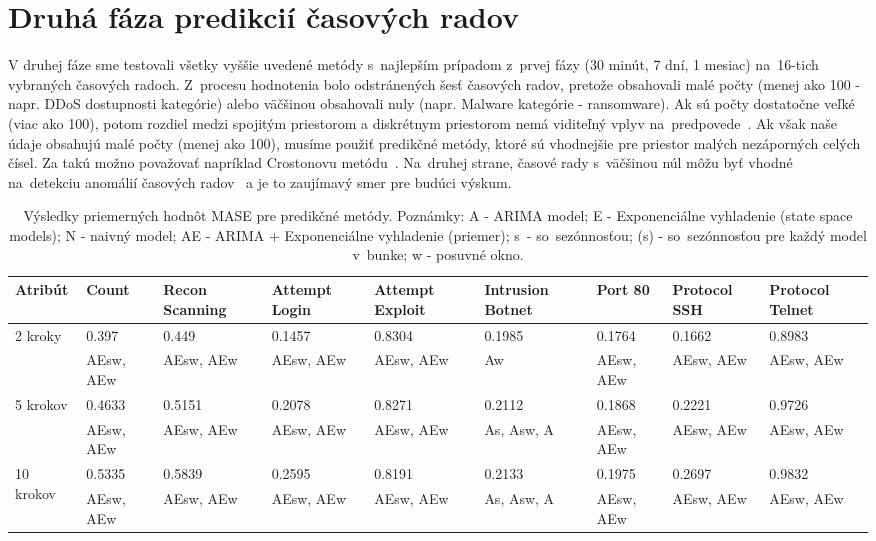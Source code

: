 \documentclass[thesismargins, thesislinespacing, openright, upjsfrontpage]{rnthesis}
\begin{document}
\section{Druhá fáza predikcií časových radov}

V druhej fáze sme testovali všetky vyššie uvedené metódy s~najlepším prípadom z~prvej fázy (30 minút, 7 dní, 1 mesiac) na~16-tich vybraných časových radoch. Z~procesu hodnotenia bolo odstránených šesť časových radov, pretože obsahovali malé počty (menej ako 100 - napr. DDoS dostupnosti kategórie) alebo väčšinou obsahovali nuly (napr. Malware kategórie - ransomware). Ak sú počty dostatočne veľké (viac ako 100), potom rozdiel medzi spojitým priestorom a diskrétnym priestorom nemá viditeľný vplyv na~predpovede~\cite{hyndman2018forecasting}. Ak však naše údaje obsahujú malé počty (menej ako 100), musíme použiť predikčné metódy, ktoré sú vhodnejšie pre priestor malých nezáporných celých čísel. Za takú možno považovať napríklad Crostonovu metódu~\cite{Croston1972ForecastingAS, Christou2015}. Na~druhej strane, časové rady s~väčšinou núl môžu byť vhodné na~detekciu anomálií časových radov~\cite{mehrotra2017anomaly} a je to zaujímavý smer pre budúci výskum.

\begin{table}[h]
    \centering
    \footnotesize 
    \begin{tabular}{|p{2cm}|p{1cm}|p{1.4cm}|p{1.2cm}|p{1.2cm}|p{1.4cm}|p{1cm}|p{1.2cm}|p{1.2cm}|} \hline
        Atribút & Count & Recon Scanning & Attempt Login & Attempt Exploit & Intrusion Botnet & Port 80 & Protocol SSH & Protocol Telnet  \\
        \hline\hline
        \multirow{2}{*}{2 kroky} & 0.397 & 0.449 & 0.1457 & 0.8304 & 0.1985 & 0.1764 & 0.1662 & 0.8983 \\
        & AEsw, AEw & AEsw, AEw & AEsw, AEw & AEsw, AEw & Aw & AEsw, AEw & AEsw, AEw & AEsw, AEw  \\
        \hline
        \multirow{2}{*}{5 krokov} & 0.4633 & 0.5151 & 0.2078 & 0.8271 & 0.2112 & 0.1868 & 0.2221 & 0.9726 \\
        & AEsw, AEw & AEsw, AEw & AEsw, AEw & AEsw, AEw & As, Asw, A & AEsw, AEw & AEsw, AEw & AEsw, AEw  \\
        \hline
        \multirow{2}{*}{10 krokov} & 0.5335 & 0.5839 & 0.2595 & 0.8191 & 0.2133 & 0.1975 & 0.2697 & 0.9832 \\
        & AEsw, AEw & AEsw, AEw & AEsw, AEw & AEsw, AEw & As, Asw, A & AEsw, AEw & AEsw, AEw & AEsw, AEw  \\
        \hline     
    \end{tabular}
    \caption{Výsledky priemerných hodnôt MASE pre predikčné metódy. Poznámky: A - ARIMA model; E - Exponenciálne vyhladenie (state space models); N - naivný model; AE - ARIMA + Exponenciálne vyhladenie (priemer); s~- so~sezónnosťou; (s) - so~sezónnosťou pre každý model v~bunke; w - posuvné okno.}
    \label{tab:mase_2nd_stage}
\end{table}
\end{document}
